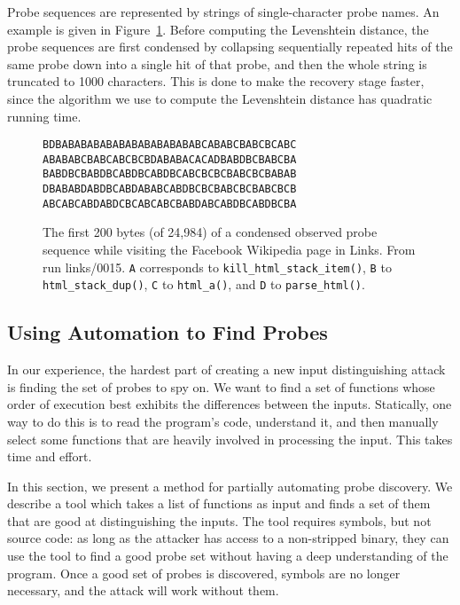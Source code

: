 \documentclass[letterpaper,twocolumn,10pt]{article}
\begin{document}
Probe sequences are represented by strings of single-character probe names. An
example is given in Figure~\ref{figure:probetext}. Before computing the
Levenshtein distance, the probe sequences are first condensed by collapsing
sequentially repeated hits of the same probe down into a single hit of that
probe, and then the whole string is truncated to 1000 characters. This is done
to make the recovery stage faster, since the algorithm we use to compute the
Levenshtein distance has quadratic running time.

\begin{figure}
    \centering
\begin{verbatim}
BDBABABABABABABABABABABABCABABCBABCBCABC
ABABABCBABCABCBCBDABABACACADBABDBCBABCBA
BABDBCBABDBCABDBCABDBCABCBCBCBABCBCBABAB
DBABABDABDBCABDABABCABDBCBCBABCBCBABCBCB
ABCABCABDABDCBCABCABCBABDABCABDBCABDBCBA
\end{verbatim}
\caption{The first 200 bytes (of 24,984) of a condensed observed probe sequence
    while visiting the Facebook Wikipedia page in Links. From run links/0015.
    \texttt{A} corresponds to \texttt{kill\_html\_stack\_item()}, \texttt{B} to
    \texttt{html\_stack\_dup()}, \texttt{C} to \texttt{html\_a()}, and
\texttt{D} to \texttt{parse\_html()}.} \label{figure:probetext}
\end{figure}

\subsection{Using Automation to Find Probes}
\label{sec:automate}
\vspace*{-.25em} %

In our experience, the hardest part of creating a new input distinguishing
attack is finding the set of probes to spy on. We want to find a set of
functions whose order of execution best exhibits the differences between the
inputs. Statically, one way to do this is to read the program's code, understand
it, and then manually select some functions that are heavily involved in
processing the input. This takes time and effort. 

In this section, we present a method for partially automating probe discovery.
We describe a tool which takes a list of functions as input and finds a set of
them that are good at distinguishing the inputs. The tool requires symbols, but
not source code: as long as the attacker has access to a non-stripped binary,
they can use the tool to find a good probe set without having a deep
understanding of the program. Once a good set of probes is discovered, symbols
are no longer necessary, and the attack will work without them.
\end{document}
